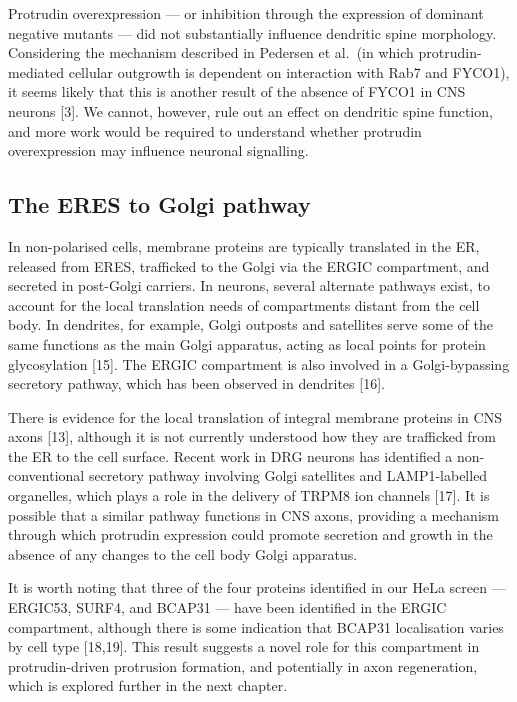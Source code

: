 \documentclass[
  12pt,
  a4paper,
]{book}
\begin{document}
Protrudin overexpression --- or inhibition through the expression of dominant negative mutants --- did not substantially influence dendritic spine morphology. Considering the mechanism described in Pedersen et al.~(in which protrudin-mediated cellular outgrowth is dependent on interaction with Rab7 and FYCO1), it seems likely that this is another result of the absence of FYCO1 in CNS neurons {[}3{]}. We cannot, however, rule out an effect on dendritic spine function, and more work would be required to understand whether protrudin overexpression may influence neuronal signalling.

\hypertarget{the-eres-to-golgi-pathway}{%
\subsection{The ERES to Golgi pathway}\label{the-eres-to-golgi-pathway}}

In non-polarised cells, membrane proteins are typically translated in the ER, released from ERES, trafficked to the Golgi via the ERGIC compartment, and secreted in post-Golgi carriers. In neurons, several alternate pathways exist, to account for the local translation needs of compartments distant from the cell body. In dendrites, for example, Golgi outposts and satellites serve some of the same functions as the main Golgi apparatus, acting as local points for protein glycosylation {[}15{]}. The ERGIC compartment is also involved in a Golgi-bypassing secretory pathway, which has been observed in dendrites {[}16{]}.

There is evidence for the local translation of integral membrane proteins in CNS axons {[}13{]}, although it is not currently understood how they are trafficked from the ER to the cell surface. Recent work in DRG neurons has identified a non-conventional secretory pathway involving Golgi satellites and LAMP1-labelled organelles, which plays a role in the delivery of TRPM8 ion channels {[}17{]}. It is possible that a similar pathway functions in CNS axons, providing a mechanism through which protrudin expression could promote secretion and growth in the absence of any changes to the cell body Golgi apparatus.

It is worth noting that three of the four proteins identified in our HeLa screen --- ERGIC53, SURF4, and BCAP31 --- have been identified in the ERGIC compartment, although there is some indication that BCAP31 localisation varies by cell type {[}18,19{]}. This result suggests a novel role for this compartment in protrudin-driven protrusion formation, and potentially in axon regeneration, which is explored further in the next chapter.
\end{document}
